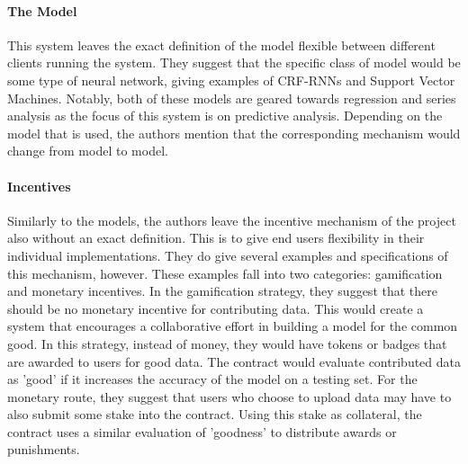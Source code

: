 \documentclass{article}
\begin{document}
    \paragraph{The Model}
    This system leaves the exact definition of the model flexible between different clients running the system.  They
    suggest that the specific class of model would be some type of neural network, giving examples of CRF-RNNs and
    Support Vector Machines.  Notably, both of these models are geared towards regression and series analysis as the
    focus of this system is on predictive analysis.  Depending on the model that is used, the authors mention that the
    corresponding mechanism would change from model to model.

    \paragraph{Incentives}
    Similarly to the models, the authors leave the incentive mechanism of the project also without an exact definition.
    This is to give end users flexibility in their individual implementations.  They do give several examples and
    specifications of this mechanism, however.  These examples fall into two categories: gamification and monetary
    incentives.  In the gamification strategy, they suggest that there should be no monetary incentive for contributing
    data.  This would create a system that encourages a collaborative effort in building a model for the common good.
    In this strategy, instead of money, they would have tokens or badges that are awarded to users for good data.  The
    contract would evaluate contributed data as 'good' if it increases the accuracy of the model on a testing set.
    For the monetary route, they suggest that users who choose to upload data may have to also submit some stake into
    the contract.  Using this stake as collateral, the contract uses a similar evaluation of 'goodness' to distribute
    awards or punishments.
\end{document}
